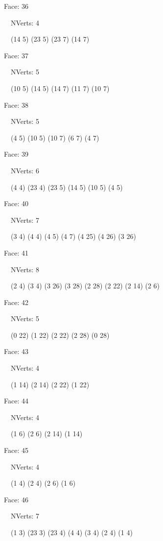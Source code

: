 \documentclass{article}
\begin{document}
{\footnotesize 

Face: 36

\   \    NVerts: 4

 \   \   (14 5) (23 5) (23 7) (14 7)}

{\footnotesize 

Face: 37

\   \    NVerts: 5

 \   \   (10 5) (14 5) (14 7) (11 7) (10 7)}

{\footnotesize 

Face: 38

\   \    NVerts: 5

 \   \   (4 5) (10 5) (10 7) (6 7) (4 7)}

{\footnotesize 

Face: 39

\   \    NVerts: 6

 \   \   (4 4) (23 4) (23 5) (14 5) (10 5) (4 5)}

{\footnotesize 

Face: 40

\   \    NVerts: 7

 \   \   (3 4) (4 4) (4 5) (4 7) (4 25) (4 26) (3 26)}

{\footnotesize 

Face: 41

\   \    NVerts: 8

 \   \   (2 4) (3 4) (3 26) (3 28) (2 28) (2 22) (2 14) (2 6)}

{\footnotesize 

Face: 42

\   \    NVerts: 5

 \   \   (0 22) (1 22) (2 22) (2 28) (0 28)}

{\footnotesize 

Face: 43

\   \    NVerts: 4

 \   \   (1 14) (2 14) (2 22) (1 22)}

{\footnotesize 

Face: 44

\   \    NVerts: 4

 \   \   (1 6) (2 6) (2 14) (1 14)}

{\footnotesize 

Face: 45

\   \    NVerts: 4

 \   \   (1 4) (2 4) (2 6) (1 6)}

{\footnotesize 

Face: 46

\   \    NVerts: 7

 \   \   (1 3) (23 3) (23 4) (4 4) (3 4) (2 4) (1 4)}
\end{document}
